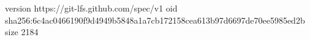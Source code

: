 version https://git-lfs.github.com/spec/v1
oid sha256:6c4ac0466190f9d4949b5848a1a7cb172158cea613b97d6697de70ee5985ed2b
size 2184
